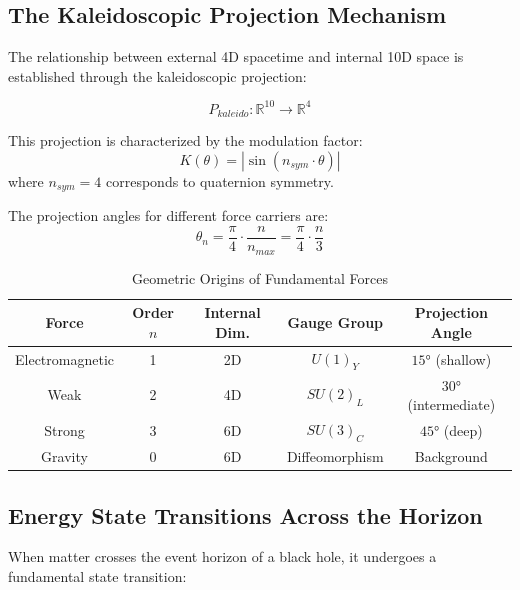 \subsection{The Kaleidoscopic Projection Mechanism}

The relationship between external 4D spacetime and internal 10D space is established through the kaleidoscopic projection:

\begin{equation}
    P_{kaleido}: \mathbb{R}^{10} \to \mathbb{R}^4
    \label{eq:kaleidoscopic_projection}
\end{equation}

This projection is characterized by the modulation factor:
\begin{equation}
    K(\theta) = |\sin(n_{sym} \cdot \theta)|
    \label{eq:kaleidoscope_factor}
\end{equation}
where $n_{sym} = 4$ corresponds to quaternion symmetry.

The projection angles for different force carriers are:
\begin{equation}
    \theta_n = \frac{\pi}{4} \cdot \frac{n}{n_{max}} = \frac{\pi}{4} \cdot \frac{n}{3}
    \label{eq:projection_angles}
\end{equation}

\begin{table}[htbp]
\centering
\caption{Geometric Origins of Fundamental Forces}
\begin{tabular}{@{}ccccc@{}}
\toprule
Force & Order $n$ & Internal Dim. & Gauge Group & Projection Angle \\
\midrule
Electromagnetic & 1 & 2D & $U(1)_Y$ & $15°$ (shallow) \\
Weak & 2 & 4D & $SU(2)_L$ & $30°$ (intermediate) \\
Strong & 3 & 6D & $SU(3)_C$ & $45°$ (deep) \\
Gravity & 0 & 6D & Diffeomorphism & Background \\
\bottomrule
\end{tabular}
\label{tab:force_origins}
\end{table}

\subsection{Energy State Transitions Across the Horizon}

When matter crosses the event horizon of a black hole, it undergoes a fundamental state transition:


